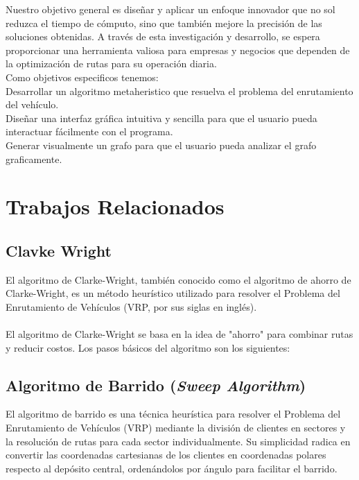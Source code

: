 \documentclass[10pt,twocolumn,letterpaper]{article}
\begin{document}
Nuestro objetivo general es diseñar y aplicar un enfoque innovador que no sol reduzca el tiempo de cómputo, sino que también mejore la precisión de las soluciones obtenidas. A través de esta investigación y desarrollo, se espera proporcionar una herramienta valiosa para empresas y negocios que dependen de la optimización de rutas para su operación diaria.\\

Como objetivos especificos tenemos:\\

	Desarrollar un algoritmo metaheristico que resuelva el problema del enrutamiento del vehículo.\\

	Diseñar una interfaz gráfica intuitiva y sencilla para que el usuario pueda interactuar fácilmente con el programa.\\

	Generar visualmente un grafo para que el usuario pueda analizar el grafo graficamente.

\section{Trabajos Relacionados}
\subsection{Clavke Wright}
El algoritmo de Clarke-Wright, también conocido como el algoritmo de ahorro de Clarke-Wright, es un método heurístico utilizado para resolver el Problema del Enrutamiento de Vehículos (VRP, por sus siglas en inglés).\\
\\
El algoritmo de Clarke-Wright se basa en la idea de "ahorro" para combinar rutas y reducir costos. Los pasos básicos del algoritmo son los siguientes:

\subsection{Algoritmo de Barrido (\textit{Sweep Algorithm})}
El algoritmo de barrido es una técnica heurística para resolver el Problema del Enrutamiento de Vehículos (VRP) mediante la división de clientes en sectores y la resolución de rutas para cada sector individualmente. Su simplicidad radica en convertir las coordenadas cartesianas de los clientes en coordenadas polares respecto al depósito central, ordenándolos por ángulo para facilitar el barrido.\\
\end{document}
